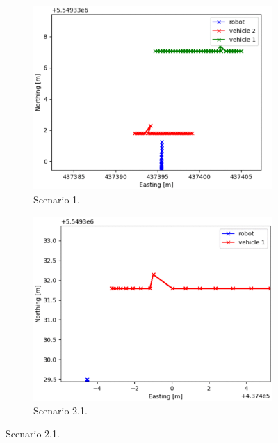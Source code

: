         \newpage
        \thispagestyle{nopagenum}
        \begin{figure}[H]
            \centering
            \begin{subfigure}{0.49\linewidth}
                \centering
                \includegraphics[width=\linewidth]{images/simulations/closest_1.png}
                \caption{Scenario 1.}
            \end{subfigure}
            \begin{subfigure}{0.49\linewidth}
                \centering
                \includegraphics[width=\linewidth]{images/simulations/closest_2_1.png}
                \caption{Scenario 2.1.}
            \end{subfigure}

\end{figure}
